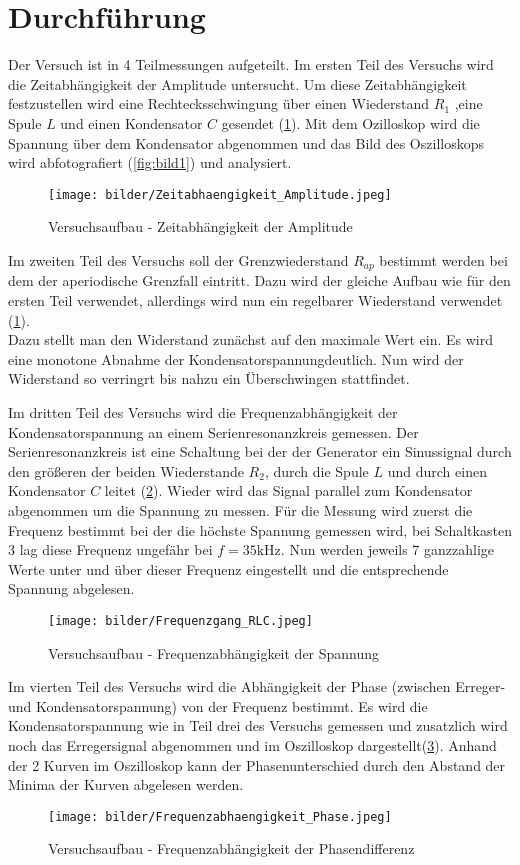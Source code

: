 \newpage
\section{Durchführung}
\label{sec:Durchfuehrung}
Der Versuch ist in 4 Teilmessungen aufgeteilt.
Im ersten Teil des Versuchs wird die Zeitabhängigkeit der Amplitude untersucht.
Um diese Zeitabhängigkeit festzustellen wird eine Rechtecksschwingung über einen Wiederstand $R_1$ ,eine Spule $L$ und einen Kondensator $C$ gesendet (\ref{fig:Aufbau1}).
Mit dem Ozilloskop wird die Spannung über dem Kondensator abgenommen und das Bild des Oszilloskops wird abfotografiert (\ref{fig:bild1}) und analysiert.
\begin{figure}
    \centering
    \texttt{[image: bilder/Zeitabhaengigkeit\_Amplitude.jpeg]}
    \caption{Versuchsaufbau - Zeitabhängigkeit der Amplitude}
    \label{fig:Aufbau1}
\end{figure}

Im zweiten Teil des Versuchs soll der Grenzwiederstand $R_{ap}$ bestimmt werden bei dem der aperiodische Grenzfall eintritt.
Dazu wird der gleiche Aufbau wie für den ersten Teil verwendet, allerdings wird nun ein regelbarer Wiederstand 
verwendet (\ref{fig:Aufbau1}).\\
Dazu stellt man den Widerstand zunächst auf den maximale Wert ein. Es wird eine monotone Abnahme der Kondensatorspannungdeutlich.
Nun wird der Widerstand so verringrt bis nahzu ein Überschwingen stattfindet.     

Im dritten Teil des Versuchs wird die Frequenzabhängigkeit der Kondensatorspannung an einem Serienresonanzkreis gemessen.
Der Serienresonanzkreis ist eine Schaltung bei der  der Generator ein Sinussignal durch den größeren der beiden Wiederstande $R_2$, durch die Spule $L$ und durch einen Kondensator $C$ leitet (\ref{fig:Aufbau2}).
Wieder wird das Signal parallel zum Kondensator abgenommen um die Spannung zu messen.
Für die Messung wird zuerst die Frequenz bestimmt bei der die höchste Spannung gemessen wird, bei Schaltkasten 3 lag diese Frequenz ungefähr bei $f = 35 \text{kHz}$.
Nun werden jeweils 7 ganzzahlige Werte unter und über dieser Frequenz eingestellt und die entsprechende Spannung abgelesen.
\begin{figure}
    \centering
    \texttt{[image: bilder/Frequenzgang\_RLC.jpeg]}
    \caption{Versuchsaufbau - Frequenzabhängigkeit der Spannung}
    \label{fig:Aufbau2}
\end{figure}

Im vierten Teil des Versuchs wird die Abhängigkeit der Phase (zwischen Erreger- und Kondensatorspannung) von der Frequenz bestimmt.
Es wird die Kondensatorspannung wie in Teil drei des Versuchs gemessen und zusatzlich wird noch das Erregersignal abgenommen und im Oszilloskop dargestellt(\ref{fig:Aufbau3}).
Anhand der 2 Kurven im Oszilloskop kann der Phasenunterschied durch den Abstand der Minima der Kurven abgelesen werden.

\begin{figure}
    \centering
    \texttt{[image: bilder/Frequenzabhaengigkeit\_Phase.jpeg]}
    \caption{Versuchsaufbau - Frequenzabhängigkeit der Phasendifferenz}
    \label{fig:Aufbau3}
\end{figure}